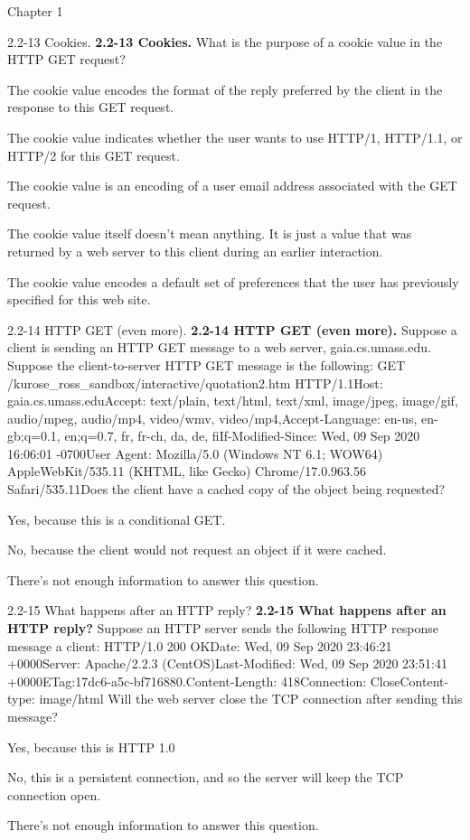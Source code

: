 \documentclass[a4paper]{article}
\begin{document}
\begin{quiz}{Chapter 1}
\begin{multi}[points=1,shuffle]{2.2-13 Cookies.}
\textbf{2.2-13 Cookies.} What is the purpose of a cookie value in the HTTP GET request?
\item The cookie value encodes the format of the reply preferred by the client in the response to this GET request.
\item The cookie value indicates whether the user wants to use HTTP/1, HTTP/1.1, or HTTP/2 for this GET request.
\item The cookie value is an encoding of a user email address associated with the GET request.
\item* The cookie value itself doesn't mean anything.  It is just a value that was returned by a web server to this client during an earlier interaction.
\item The cookie value encodes a default set of preferences that the user has previously specified for this web site.
\end{multi}

\begin{multi}[points=1,shuffle]{2.2-14 HTTP GET (even more).}
\textbf{2.2-14 HTTP GET (even more).} Suppose a client is sending an HTTP GET message to a web server, gaia.cs.umass.edu. Suppose the client-to-server HTTP GET message is the following: GET /kurose_ross_sandbox/interactive/quotation2.htm HTTP/1.1Host: gaia.cs.umass.eduAccept: text/plain, text/html, text/xml, image/jpeg, image/gif, audio/mpeg, audio/mp4, video/wmv, video/mp4,Accept-Language: en-us, en-gb;q=0.1, en;q=0.7, fr, fr-ch, da, de, fiIf-Modified-Since: Wed, 09 Sep 2020 16:06:01 -0700User Agent: Mozilla/5.0 (Windows NT 6.1; WOW64) AppleWebKit/535.11 (KHTML, like Gecko) Chrome/17.0.963.56 Safari/535.11Does the client have a cached copy of the object being requested?
\item* Yes, because this is a conditional GET.
\item No, because the client would not request an object if it were cached.
\item There’s not enough information to answer this question.
\end{multi}

\begin{multi}[points=1,shuffle]{2.2-15 What happens after an HTTP reply?}
\textbf{2.2-15 What happens after an HTTP reply?} Suppose an HTTP server sends the following HTTP response message a client: HTTP/1.0 200 OKDate: Wed, 09 Sep 2020 23:46:21 +0000Server: Apache/2.2.3 (CentOS)Last-Modified: Wed, 09 Sep 2020 23:51:41 +0000ETag:17dc6-a5c-bf716880.Content-Length: 418Connection: CloseContent-type: image/html Will the web server close the TCP connection after sending this message?
\item* Yes, because this is HTTP 1.0
\item No, this is a persistent connection, and so the server will keep the TCP connection open.
\item There’s not enough information to answer this question.
\end{multi}


\end{quiz}
\end{document}
